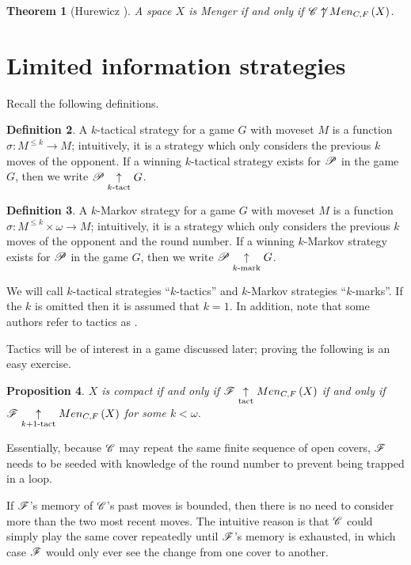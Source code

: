 \documentclass{amsart}
\newtheorem{theorem}{Theorem}[section]
\newtheorem{proposition}[theorem]{Proposition}
\theoremstyle{definition}
\newtheorem{definition}[theorem]{Definition}
\begin{document}
\begin{theorem}[Hurewicz \cite{MR1544773}]
  A space \(X\) is Menger if and only if \(\mathscr{C}\not\uparrow Men_{C,F}\left({X}\right)\).
\end{theorem}


\section{Limited information strategies}

Recall the following definitions.

\begin{definition}
  A \(k\)-tactical strategy for a game \(G\) with moveset \(M\) is a function
  \(\sigma:M^{\leq k}\to M\); intuitively, it is a strategy which only considers
  the previous \(k\) moves of the opponent. If a winning \(k\)-tactical strategy
  exists for \(\mathscr{P}\) in the game \(G\), then we write \(\mathscr{P}\underset{k\text{-tact}}{\uparrow} G\).
\end{definition}

\begin{definition}
  A \(k\)-Markov strategy for a game \(G\) with moveset \(M\) is a function
  \(\sigma:M^{\leq k}\times\omega\to M\); intuitively, it is a strategy which
  only considers the previous \(k\) moves of the opponent and the round number.
  If a winning \(k\)-Markov strategy exists for
  \(\mathscr{P}\) in the game \(G\), then we write \(\mathscr{P}\underset{k\text{-mark}}{\uparrow} G\).
\end{definition}

We will call \(k\)-tactical strategies ``\(k\)-tactics'' and \(k\)-Markov strategies
``\(k\)-marks''. If the \(k\) is omitted then it is assumed that \(k=1\). In
addition, note that some authors refer to tactics as
.

Tactics will be of interest in a game discussed later; proving
the following is an easy exercise.

\begin{proposition}
  \(X\) is compact if and only if
  \(\mathscr{F} \underset{\text{tact}}{\uparrow} Men_{C,F}\left({X}\right)\) if and only if
  \(\mathscr{F} \underset{k+1\text{-tact}}{\uparrow} Men_{C,F}\left({X}\right)\) for some \(k<\omega\).
\end{proposition}

Essentially, because \(\mathscr{C}\) may repeat the same finite sequence of open covers,
\(\mathscr{F}\) needs to be seeded with knowledge of the round number to prevent being
trapped in a loop.

If \(\mathscr{F}\)'s memory of \(\mathscr{C}\)'s past moves is bounded, then
there is no need to consider more than the two most recent moves. The
intuitive reason is that \(\mathscr{C}\) could simply play the same cover repeatedly
until \(\mathscr{F}\)'s memory is exhausted, in which case \(\mathscr{F}\) would only ever
see the change from one cover to another.
\end{document}
